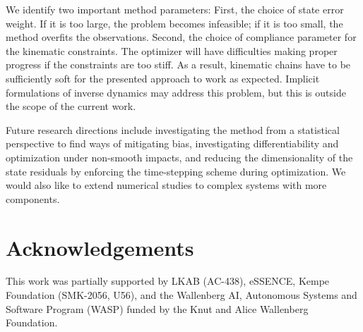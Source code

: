 \documentclass[preprint,12pt]{elsarticle}
\numberwithin{equation}{section}
\begin{document}
We identify two important method parameters:
First, the choice of state error weight.
If it is too large, the problem becomes infeasible; if it is too small, the method overfits the observations.
Second, the choice of compliance parameter for the kinematic constraints.
The optimizer will have difficulties making proper progress if the constraints are too stiff.
As a result, kinematic chains have to be sufficiently soft for the presented approach to work as expected.
Implicit formulations of inverse dynamics may address this problem, but this is outside the scope of the current work.

Future research directions include investigating the method from a statistical perspective to find ways of mitigating bias, investigating differentiability and optimization under non-smooth impacts, and reducing the dimensionality of the state residuals by enforcing the time-stepping scheme during optimization.
We would also like to extend numerical studies to complex systems with more components.

\section*{Acknowledgements}
This work was partially supported by LKAB (AC-438), eSSENCE, Kempe Foundation (SMK-2056, U56), and the Wallenberg AI, Autonomous Systems and Software Program (WASP) funded by the Knut and Alice Wallenberg Foundation.




\appendix
\end{document}
